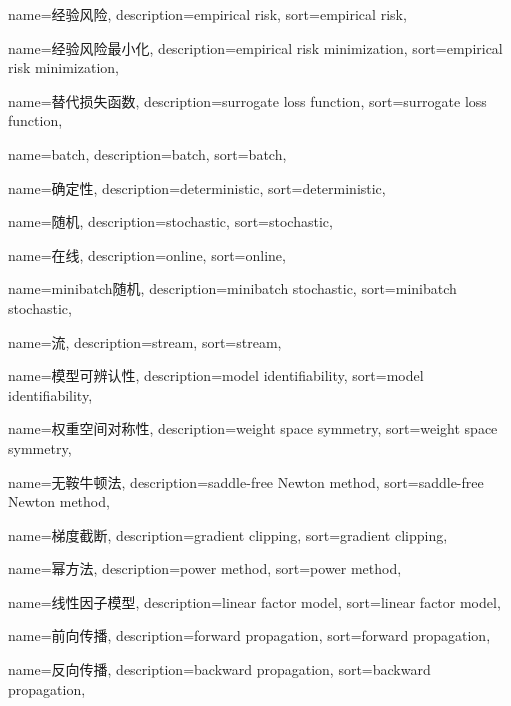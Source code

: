 {
  name=经验风险,
  description={empirical risk},
  sort={empirical risk},
}

{
  name=经验风险最小化,
  description={empirical risk minimization},
  sort={empirical risk minimization},
}

{
  name=替代损失函数,
  description={surrogate loss function},
  sort={surrogate loss function},
}

{
  name=batch,
  description={batch},
  sort={batch},
}

{
  name=确定性,
  description={deterministic},
  sort={deterministic},
}

{
  name=随机,
  description={stochastic},
  sort={stochastic},
}

{
  name=在线,
  description={online},
  sort={online},
}

{
  name=minibatch随机, %
  description={minibatch stochastic},
  sort={minibatch stochastic},
}

{
  name=流,
  description={stream},
  sort={stream},
}

{
  name=模型可辨认性,
  description={model identifiability},
  sort={model identifiability},
}

{
  name=权重空间对称性,
  description={weight space symmetry},
  sort={weight space symmetry},
}

{
  name=无鞍牛顿法,
  description={saddle-free Newton method},
  sort={saddle-free Newton method},
}

{
  name=梯度截断,
  description={gradient clipping},
  sort={gradient clipping},
}

{
  name=幂方法,
  description={power method},
  sort={power method},
}

{
  name=线性因子模型,
  description={linear factor model},
  sort={linear factor model},
}

{
  name=前向传播,
  description={forward propagation},
  sort={forward propagation},
}

{
  name=反向传播,
  description={backward propagation},
  sort={backward propagation},
}

